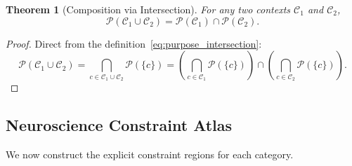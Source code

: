\documentclass[aps,prd,twocolumn,superscriptaddress,floatfix,nofootinbib]{revtex4-2}
\newtheorem{theorem}{Theorem}[section]
\theoremstyle{remark}
\newcommand{\Purpose}{\mathcal{P}}
\newcommand{\Context}{\mathcal{C}}
\begin{document}
\begin{theorem}[Composition via Intersection]
\label{thm:composition}
For any two contexts $\Context_1$ and $\Context_2$,
\begin{equation}
\boxed{\Purpose(\Context_1 \cup \Context_2) = \Purpose(\Context_1) \cap \Purpose(\Context_2).}
\label{eq:composition}
\end{equation}
\end{theorem}

\begin{proof}
Direct from the definition~\eqref{eq:purpose_intersection}:
\[
\Purpose(\Context_1 \cup \Context_2) = \bigcap_{c \in \Context_1 \cup \Context_2} \Purpose(\{c\}) = \left(\bigcap_{c \in \Context_1} \Purpose(\{c\})\right) \cap \left(\bigcap_{c \in \Context_2} \Purpose(\{c\})\right).
\]
\end{proof}

\subsection{Neuroscience Constraint Atlas}

We now construct the explicit constraint regions for each category.
\end{document}
